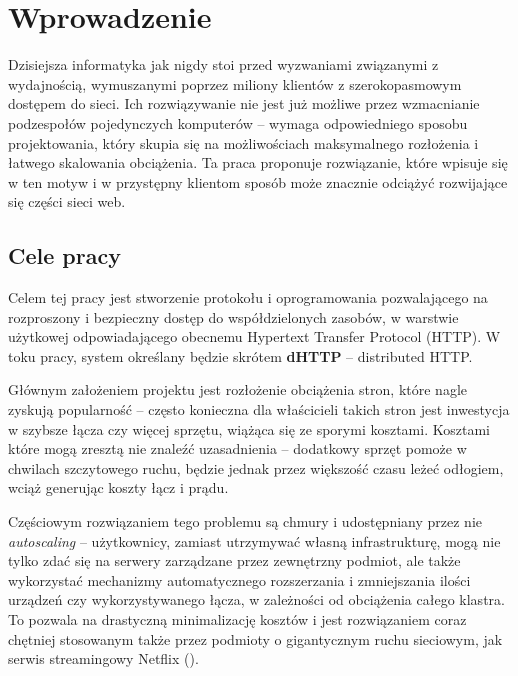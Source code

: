 \chapter{Wprowadzenie}
\label{cha:wprowadzenie}

Dzisiejsza informatyka jak nigdy stoi przed wyzwaniami związanymi z wydajnością, wymuszanymi poprzez miliony klientów z szerokopasmowym dostępem do sieci. Ich rozwiązywanie nie jest już możliwe przez wzmacnianie podzespołów pojedynczych komputerów -- wymaga odpowiedniego sposobu projektowania, który skupia się na możliwościach maksymalnego rozłożenia i łatwego skalowania obciążenia. Ta praca proponuje rozwiązanie, które wpisuje się w ten motyw i w przystępny klientom sposób może znacznie odciążyć rozwijające się części sieci web.

\section{Cele pracy}
\label{sec:celePracy}


Celem tej pracy jest stworzenie protokołu i oprogramowania pozwalającego na rozproszony i bezpieczny dostęp do współdzielonych zasobów, w warstwie użytkowej odpowiadającego obecnemu Hypertext Transfer Protocol (HTTP). W toku pracy, system określany będzie skrótem \textbf{dHTTP} -- distributed HTTP.


Głównym założeniem projektu jest rozłożenie obciążenia stron, które nagle zyskują popularność -- często konieczna dla właścicieli takich stron jest inwestycja w szybsze łącza czy więcej sprzętu, wiążąca się ze sporymi kosztami. Kosztami które mogą zresztą nie znaleźć uzasadnienia -- dodatkowy sprzęt pomoże w chwilach szczytowego ruchu, będzie jednak przez większość czasu leżeć odłogiem, wciąż generując koszty łącz i prądu.

Częściowym rozwiązaniem tego problemu są chmury i udostępniany przez nie {\em autoscaling} -- użytkownicy, zamiast utrzymywać własną infrastrukturę, mogą nie tylko zdać się na serwery zarządzane przez zewnętrzny podmiot, ale także wykorzystać mechanizmy automatycznego rozszerzania i zmniejszania ilości urządzeń czy wykorzystywanego łącza, w zależności od obciążenia całego klastra. To pozwala na drastyczną minimalizację kosztów i jest rozwiązaniem coraz chętniej stosowanym także przez podmioty o gigantycznym ruchu sieciowym, jak serwis streamingowy Netflix (\cite{AWSAs}).

